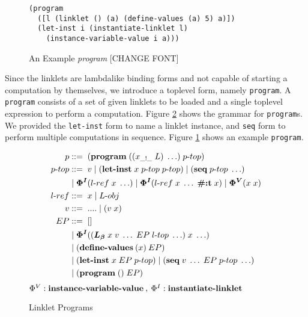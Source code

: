 \documentclass[sigplan,screen,anonymous]{acmart}
\def\dash {\text{-}}
\begin{document}
\begin{figure}[h]
\begin{verbatim}
(program
  ([l (linklet () (a) (define-values (a) 5) a)])
  (let-inst i (instantiate-linklet l)
    (instance-variable-value i a)))
\end{verbatim}
\caption{An Example \textit{program} [CHANGE FONT]}
\label{fig:program-example}
\end{figure}

Since the linklets are lambda\dash like binding forms and not capable
of starting a computation by themselves, we introduce a top\dash level
form, namely \verb|program|. A \verb|program| consists of a set of
given linklets to be loaded and a single top\dash level expression to
perform a computation. Figure \ref{fig:linklet-program} shows the
grammar for \verb|program|s. We provided the \verb|let-inst| form to
name a linklet instance, and \verb|seq| form to perform multiple
computations in sequence. Figure \ref{fig:program-example} shows an
example \verb|program|.



\begin{figure}[h!]
  \begin{align*}
    p           &::=\; (\textbf{program}\; ((x_{\_!\_}\; L)\; \ldots)\; p\dash top) \\
    p\dash top  &::=\; v\; |\; (\textbf{let\dash inst}\; x\; p\dash top\;p\dash top)\; |\; (\textbf{seq}\; p\dash top\; \ldots) \\
    \;          &\;|\; \bm{\Phi^I}(l\dash ref\; x\; \ldots)\; |\; \bm{\Phi^I}(l\dash ref\; x\; \ldots\; \textbf{\#:t}\; x)\; |\; \bm{\Phi^V}(x\; x) \\
    l\dash ref &::=\; x\; |\; L\dash obj \\
    v           &::=\; ....\;|\;(v\;x) \\
    EP          &::=\; [] \\
    \;          &\;|\; \bm{\Phi^I}((\lb\; x\; v\; \ldots\; EP\; l\dash top\; \ldots)\; x\; \ldots) \\
    \;          &\;|\; (\textbf{define\dash values}\:(x)\:EP) \\
    \;          &\;|\; (\textbf{let\dash inst}\; x\; EP\; p\dash top)\; |\; (\textbf{seq}\; v\; \ldots\; EP\; p\dash top\; \ldots) \\
    \;          &\;|\; (\textbf{program}\; ()\; EP) \\
  \end{align*}
  \hfill \footnotesize $\Phi^V : \textbf{instance\dash variable\dash value}\:,\: \Phi^I : \textbf{instantiate\dash linklet}$
\caption{Linklet Programs}
\label{fig:linklet-program}
\end{figure}
\end{document}
